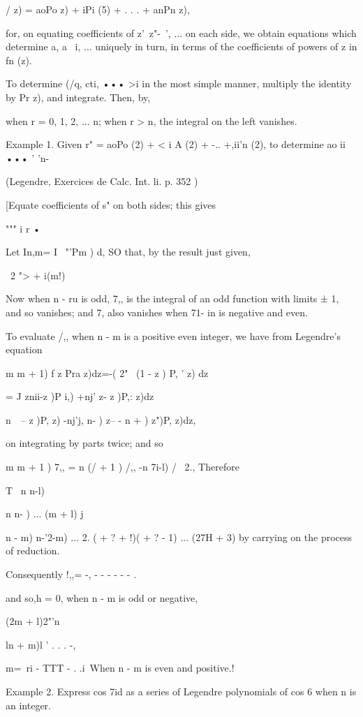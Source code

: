 {/ z) = aoPo z) + iPi (5) + . . . + anPn z),

for, on equating coefficients of z'\ z"-~', ... on each side, we
obtain equations which determine a, a \ i, ... uniquely in turn, in
terms of the coefficients of powers of z in fn (z).

To determine (/q, cti, ••• >i in the most simple manner, multiply the
identity by Pr z), and integrate. Then, by,

when r = 0, 1, 2, ... n; when r > n, the integral on the left
vanishes.

Example 1. Given r" = aoPo (2) + < i A (2) + -.. +,ii'n (2), to
determine ao ii ••• ' 'n-

(Legendre, Exercices de Calc. Int. li. p. 352 )

[Equate coefficients of s" on both sides; this gives

""" i r •

Let In,m= I ~"'Pm ) d, SO that, by the result just given,

\ 2 "> + i(m!)

Now when n - ru is odd, 7,, is the integral of an odd function with
limits ± 1, and so vanishes; and 7, also vanishes when 71- in is
negative and even.

To evaluate /,, when n - m is a positive even integer, we have from
Legendre's equation

m m + 1) f z Pra z)dz=-( 2" \ (1 - z ) P, ' z) dz

= J znii-z )P i,) +nj' z- z )P,: z)dz

  n\ \ -- z )P, z) -nj'j, n- ) z-- - n + ) z")P, z)dz,

on integrating by parts twice; and so

m m + 1 ) 7,, = n (/ + 1 ) /,, -n 7i-l) / \ 2., Therefore

T \ n n-l)

n n- ) ... (m + l) j

 n - m) n-'2-m) ... 2. ( + ? + !)( + ? - 1) ... (27H + 3) by carrying
on the process of reduction.

%
%

Consequently !,,= -, - - - - - - .

and so,h = 0, when n - m is odd or negative,

(2m + l)2"'n\ \ {ln + m)l ' . . . -,

 m=~ri - TTT - . .i\, When n - m is even and positive.!

Example 2. Express cos 7id as a series of Legendre polynomials of cos
6 when n is an integer.

}}
